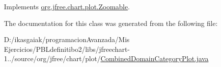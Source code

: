Implements \mbox{\hyperlink{interfaceorg_1_1jfree_1_1chart_1_1plot_1_1_zoomable_a727d674650212288e299f6e32f498e07}{org.\+jfree.\+chart.\+plot.\+Zoomable}}.



The documentation for this class was generated from the following file\+:\begin{DoxyCompactItemize}
\item 
D\+:/ikasgaiak/programacion\+Avanzada/\+Mis Ejercicios/\+P\+B\+Ldefinitibo2/libs/jfreechart-\/1../source/org/jfree/chart/plot/\mbox{\hyperlink{_combined_domain_category_plot_8java}{Combined\+Domain\+Category\+Plot.\+java}}\end{DoxyCompactItemize}
